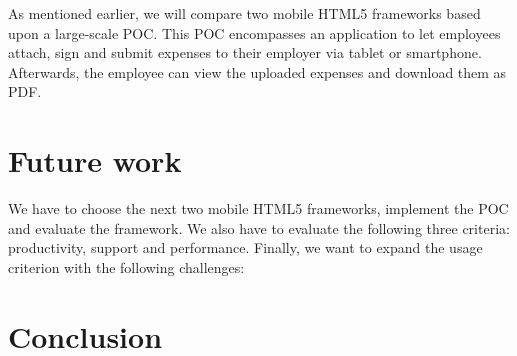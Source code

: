 \documentclass[a4paper]{artikel3}
\begin{document}
As mentioned earlier,  we will compare two mobile HTML5 frameworks based upon a large-scale POC.  
This POC encompasses an application to let employees attach, sign and submit expenses to their employer via tablet or smartphone.
Afterwards, the employee can view the uploaded expenses and download them as PDF.

\section{Future work} %
\label{sec:future_work}
We have to choose the next two mobile HTML5 frameworks, implement the POC and evaluate the framework.
We also have to evaluate the following three criteria: productivity, support and performance. 
Finally, we want to expand the usage criterion with the following challenges:



\section{Conclusion} %
\label{sec:conclusion}




%


\end{document}
